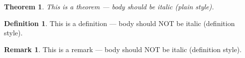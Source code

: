 \documentclass{article}
\newtheorem{theorem}{Theorem}
\theoremstyle{definition}
\newtheorem{definition}{Definition}
\newtheorem{remark}{Remark}
\begin{document}
\begin{theorem}
  This is a theorem — body should be italic (plain style).
\end{theorem}
\begin{definition}
  This is a definition — body should NOT be italic (definition style).
\end{definition}
\begin{remark}
  This is a remark — body should NOT be italic (definition style).
\end{remark}
\end{document}

